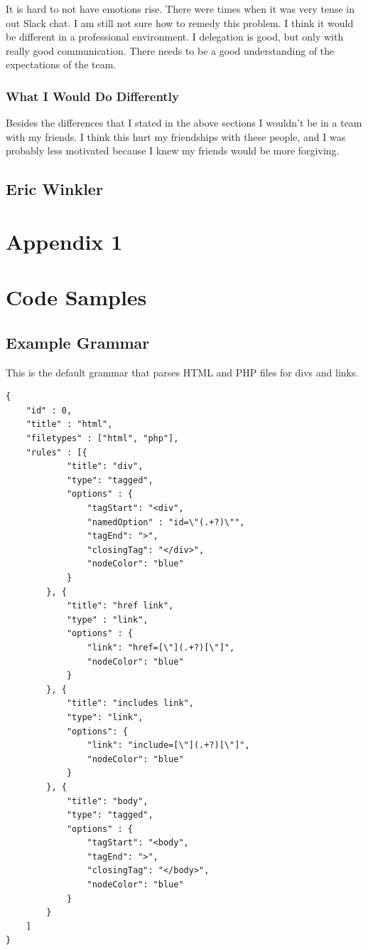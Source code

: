 \documentclass[letterpaper,10pt,titlepage,draftclsnofoot,onecolumn,onesided] {IEEEtran}
\begin{document}
It is hard to not have emotions rise.
There were times when it was very tense in out Slack chat. 
I am still not sure how to remedy this problem.
I think it would be different in a professional environment.
I delegation is good, but only with really good communication.
There needs to be a good understanding of the expectations of the team.
 
\subsubsection{What I Would Do Differently}

Besides the differences that I stated in the above sections I wouldn't be in a team with my friends. 
I think this hurt my friendships with these people, and I was probably less motivated because I knew my friends would be more forgiving. 



\subsection{Eric Winkler}

\pagebreak
\section{Appendix 1}
\section{Code Samples}
	\subsection{Example Grammar}
	This is the default grammar that parses HTML and PHP files for divs and links.
	
	\begin{lstlisting}
{
    "id" : 0,
    "title" : "html",
    "filetypes" : ["html", "php"],
    "rules" : [{
            "title": "div",
            "type": "tagged",
            "options" : {
                "tagStart": "<div",
                "namedOption" : "id=\"(.+?)\"",
                "tagEnd": ">",
                "closingTag": "</div>",
                "nodeColor": "blue"
            }
        }, {
            "title": "href link",
            "type" : "link",
            "options" : {
                "link": "href=[\"](.+?)[\"]",
                "nodeColor": "blue"
            }
        }, {
            "title": "includes link",
            "type": "link",
            "options": {
                "link": "include=[\"](.+?)[\"]",
                "nodeColor": "blue"
            }
        }, {
            "title": "body",
            "type": "tagged",
            "options" : {
                "tagStart": "<body",
                "tagEnd": ">",
                "closingTag": "</body>",
                "nodeColor": "blue"
            }
        }
    ]
}
	\end{lstlisting}
\end{document}
